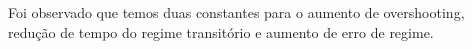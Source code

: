 Foi observado que temos duas constantes para o aumento de overshooting, redução de tempo do regime transitório e aumento de
erro de regime.